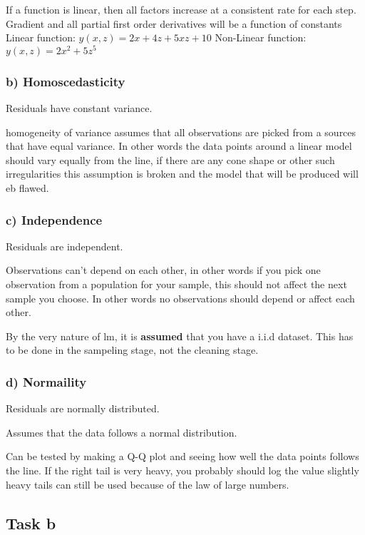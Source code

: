 \documentclass[
]{article}
\begin{document}
If a function is linear, then all factors increase at a consistent rate
for each step. Gradient and all partial first order derivatives will be
a function of constants Linear function: \(y(x,z) = 2x + 4z + 5xz + 10\)
Non-Linear function: \(y(x,z) = 2x^2 + 5z^5\)

\subsubsection{b) Homoscedasticity}\label{b-homoscedasticity}

Residuals have constant variance.

homogeneity of variance assumes that all observations are picked from a
sources that have equal variance. In other words the data points around
a linear model should vary equally from the line, if there are any cone
shape or other such irregularities this assumption is broken and the
model that will be produced will eb flawed.

\subsubsection{c) Independence}\label{c-independence}

Residuals are independent.

Observations can't depend on each other, in other words if you pick one
observation from a population for your sample, this should not affect
the next sample you choose. In other words no observations should depend
or affect each other.

By the very nature of lm, it is \textbf{assumed} that you have a i.i.d
dataset. This has to be done in the sampeling stage, not the cleaning
stage.

\subsubsection{d) Normaility}\label{d-normaility}

Residuals are normally distributed.

Assumes that the data follows a normal distribution.

Can be tested by making a Q-Q plot and seeing how well the data points
follows the line. If the right tail is very heavy, you probably should
log the value slightly heavy tails can still be used because of the law
of large numbers.

\subsection{Task b}\label{task-b-2}
\end{document}

